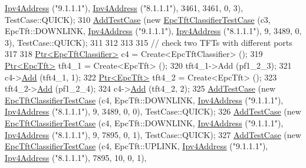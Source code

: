 \begin{DoxyCode}
      \hyperlink{classns3_1_1Ipv4Address}{Ipv4Address} (\textcolor{stringliteral}{"9.1.1.1"}), \hyperlink{classns3_1_1Ipv4Address}{Ipv4Address} (\textcolor{stringliteral}{"8.1.1.1"}),  3461,     3461,     0,    3), 
      TestCase::QUICK);
310   \hyperlink{classns3_1_1TestCase_a3718088e3eefd5d6454569d2e0ddd835}{AddTestCase} (\textcolor{keyword}{new} \hyperlink{classEpcTftClassifierTestCase}{EpcTftClassifierTestCase} (c3, EpcTft::DOWNLINK, 
      \hyperlink{classns3_1_1Ipv4Address}{Ipv4Address} (\textcolor{stringliteral}{"9.1.1.1"}), \hyperlink{classns3_1_1Ipv4Address}{Ipv4Address} (\textcolor{stringliteral}{"8.1.1.1"}),     9,     3489,     0,    3), 
      TestCase::QUICK);
311 
312 
313 
315   \textcolor{comment}{// check two TFTs with different ports}
317 \textcolor{comment}{}
318   \hyperlink{classns3_1_1Ptr}{Ptr<EpcTftClassifier>} c4 = Create<EpcTftClassifier> ();
319   \hyperlink{classns3_1_1Ptr}{Ptr<EpcTft>} tft4\_1 = Create<EpcTft> ();
320   tft4\_1->Add (pf1\_2\_3);  
321   c4->\hyperlink{classns3_1_1EpcTftClassifier_a4a0dd2623dd9bfbfb806183625af74bd}{Add} (tft4\_1, 1);
322   \hyperlink{classns3_1_1Ptr}{Ptr<EpcTft>} tft4\_2 = Create<EpcTft> ();
323   tft4\_2->\hyperlink{classns3_1_1EpcTft_a1228456a8abbe48cbc89bbe2d2e9af48}{Add} (pf1\_2\_4);
324   c4->\hyperlink{classns3_1_1EpcTftClassifier_a4a0dd2623dd9bfbfb806183625af74bd}{Add} (tft4\_2, 2);
325   \hyperlink{classns3_1_1TestCase_a3718088e3eefd5d6454569d2e0ddd835}{AddTestCase} (\textcolor{keyword}{new} \hyperlink{classEpcTftClassifierTestCase}{EpcTftClassifierTestCase} (c4, EpcTft::DOWNLINK, 
      \hyperlink{classns3_1_1Ipv4Address}{Ipv4Address} (\textcolor{stringliteral}{"9.1.1.1"}), \hyperlink{classns3_1_1Ipv4Address}{Ipv4Address} (\textcolor{stringliteral}{"8.1.1.1"}),     9,     3489,     0,    0), 
      TestCase::QUICK);
326   \hyperlink{classns3_1_1TestCase_a3718088e3eefd5d6454569d2e0ddd835}{AddTestCase} (\textcolor{keyword}{new} \hyperlink{classEpcTftClassifierTestCase}{EpcTftClassifierTestCase} (c4, EpcTft::DOWNLINK, 
      \hyperlink{classns3_1_1Ipv4Address}{Ipv4Address} (\textcolor{stringliteral}{"9.1.1.1"}), \hyperlink{classns3_1_1Ipv4Address}{Ipv4Address} (\textcolor{stringliteral}{"8.1.1.1"}),     9,     7895,     0,    1), 
      TestCase::QUICK);
327   \hyperlink{classns3_1_1TestCase_a3718088e3eefd5d6454569d2e0ddd835}{AddTestCase} (\textcolor{keyword}{new} \hyperlink{classEpcTftClassifierTestCase}{EpcTftClassifierTestCase} (c4, EpcTft::UPLINK,   
      \hyperlink{classns3_1_1Ipv4Address}{Ipv4Address} (\textcolor{stringliteral}{"9.1.1.1"}), \hyperlink{classns3_1_1Ipv4Address}{Ipv4Address} (\textcolor{stringliteral}{"8.1.1.1"}),  7895,       10,     0,    1), 

\end{DoxyCode}
